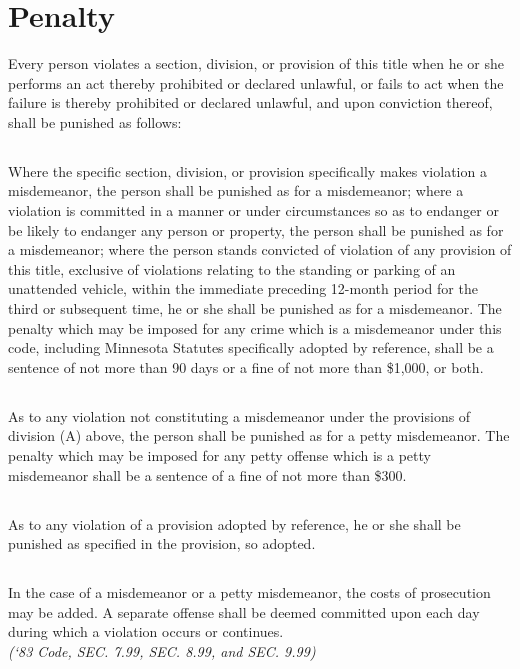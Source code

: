 \setcounter{section}{98}
\section{Penalty}
Every person violates a section, division, or provision of this title when he or she performs an act thereby prohibited or declared unlawful, or fails to act when the failure is thereby prohibited or declared unlawful, and upon conviction thereof, shall be punished as follows:
\subsection{}
Where the specific section, division, or provision specifically makes violation a misdemeanor, the person shall be punished as for a misdemeanor; where a violation is committed in a manner or under circumstances so as to endanger or be likely to endanger any person or property, the person shall be punished as for a misdemeanor; where the person stands convicted of violation of any provision of this title, exclusive of violations relating to the standing or parking of an unattended vehicle, within the immediate preceding 12-month period for the third or subsequent time, he or she shall be punished as for a misdemeanor.  The penalty which may be imposed for any crime which is a misdemeanor under this code, including Minnesota Statutes specifically adopted by reference, shall be a sentence of not more than 90 days or a fine of not more than \$1,000, or both.
\subsection{}
As to any violation not constituting a misdemeanor under the provisions of division (A) above,  the person shall be punished as for a petty misdemeanor.  The penalty which may be imposed for any petty offense which is a petty misdemeanor shall be a sentence of a fine of not more than \$300.
\subsection{}
As to any violation of a provision adopted by reference, he or she shall be punished as specified in the provision, so adopted.
\subsection{}
In the case of a misdemeanor or a petty misdemeanor, the costs of prosecution may be added.  A separate offense shall be deemed committed upon each day during which a violation occurs or continues.\\
\emph{(‘83 Code, SEC. 7.99, SEC. 8.99, and SEC. 9.99)}
